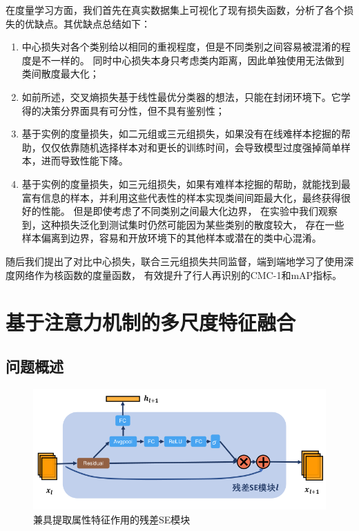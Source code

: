 在度量学习方面，我们首先在真实数据集上可视化了现有损失函数，分析了各个损失的优缺点。其优缺点总结如下：
\begin{enumerate}
	\item 中心损失对各个类别给以相同的重视程度，但是不同类别之间容易被混淆的程度是不一样的。
	      同时中心损失本身只考虑类内距离，因此单独使用无法做到类间散度最大化；
	\item 
	      如前所述，交叉熵损失基于线性最优分类器的想法，只能在封闭环境下。它学得的决策分界面具有可分性，但不具有鉴别性；
	\item 
	      基于实例的度量损失，如二元组或三元组损失，如果没有在线难样本挖掘的帮助\cite{yaqing2016semantics}，仅仅依靠随机选择样本对和更长的训练时间，会导致模型过度强掉简单样本，进而导致性能下降。
	\item 
	      基于实例的度量损失，如三元组损失，如果有难样本挖掘的帮助，就能找到最富有信息的样本，并利用这些代表性的样本实现类间间距最大化，最终获得很好的性能。
	      但是即使考虑了不同类别之间最大化边界，
	      在实验中我们观察到，这种损失泛化到测试集时仍然可能因为某些类别的散度较大，
	      存在一些样本偏离到边界，容易和开放环境下的其他样本或潜在的类中心混淆。
\end{enumerate}

随后我们提出了对比中心损失，联合三元组损失共同监督，端到端地学习了使用深度网络作为核函数的度量函数，
有效提升了行人再识别的CMC-1和mAP指标。

\chapter{基于注意力机制的多尺度特征融合} \label{chap:attention}

\section{问题概述}

\begin{figure}
	\centering
	\includegraphics[width=\textwidth]{fig/2018-05-11-16-53-10.png}
	\caption{兼具提取属性特征作用的残差SE模块}
	\label{fig:resse}
\end{figure}

